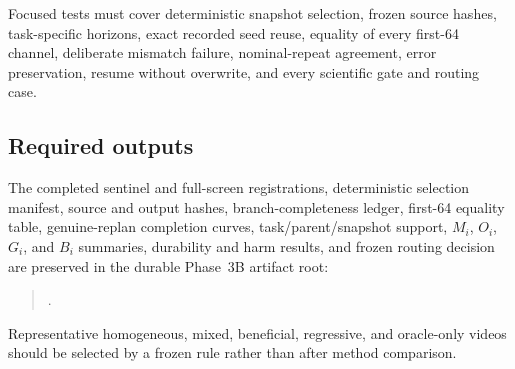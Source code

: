 Focused tests must cover deterministic snapshot selection, frozen source hashes, task-specific horizons, exact recorded seed reuse, equality of every first-64 channel, deliberate mismatch failure, nominal-repeat agreement, error preservation, resume without overwrite, and every scientific gate and routing case.

\subsection{Required outputs}

The completed sentinel and full-screen registrations, deterministic selection manifest, source and output hashes, branch-completeness ledger, first-64 equality table, genuine-replan completion curves, task/parent/snapshot support, $M_i$, $O_i$, $G_i$, and $B_i$ summaries, durability and harm results, and frozen routing decision are preserved in the durable Phase~3B artifact root:
\begin{quote}
\raggedright\small
{}
.
\end{quote}
Representative homogeneous, mixed, beneficial, regressive, and oracle-only videos should be selected by a frozen rule rather than after method comparison.
